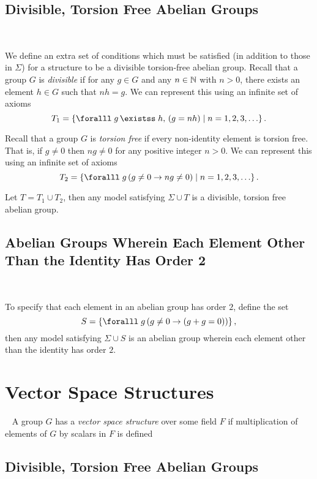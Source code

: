 \subsection{Divisible, Torsion Free Abelian Groups}~\label{sec:axioms-div}

We define an extra set of conditions
which must be satisfied (in addition to those in $\Sigma$)
for a structure to be a divisible torsion-free abelian group.
Recall that a group $G$ is \emph{divisible} if for any $g \in G$
and any $n \in \mathbb{N}$ with $n > 0$, there exists an element $h \in G$
such that $n h = g$.
We can represent this using an infinite set of axioms
\[ T_1 = \set{ \forall g\, \exists h,\, (g = nh) \mid n = 1, 2, 3, \ldots }. \]

Recall that a group $G$ is \emph{torsion free} if every non-identity element
is torsion free. That is, if $g \neq 0$ then $ng \neq 0$ for any positive
integer $n > 0$. We can represent this using an infinite set of axioms
\[ T_2 = \set{ \forall g\, (g \neq 0 \lto ng \neq 0) \mid n = 1, 2, 3, \ldots }. \]

Let $T = T_1 \cup T_2$, then any model satisfying $\Sigma \cup T$
is a divisible, torsion free abelian group.



\subsection{Abelian Groups Wherein Each Element Other Than the Identity
Has Order 2}~\label{sec:axiom-order-two}

To specify that each element in an abelian group has order $2$,
define the set
\[ S = \set{\forall g\, ( g \neq 0 \lto (g + g = 0) ) }, \]
then any model satisfying $\Sigma \cup S$ is an abelian group
wherein each element other than the identity has order $2$.


\section{Vector Space Structures}~\label{sec:vec-space-structures}
A group $G$ has a \emph{vector space structure} over some field $F$
if multiplication of elements of $G$ by scalars in $F$ is defined

\subsection{Divisible, Torsion Free Abelian Groups}
~\label{sec:adiv-torsion-free-abelian-groups}

